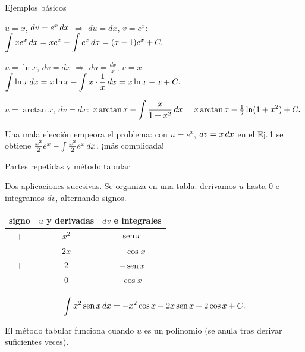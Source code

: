 \documentclass[10pt,aspectratio=169]{beamer}
\begin{document}
\begin{frame}{Ejemplos básicos}
  \begin{ejemplo}[1: $\int x e^x\dx$]
    $u=x$, $dv=e^x\,dx$ $\Rightarrow$ $du=dx$, $v=e^x$:
    \quad $\displaystyle\int xe^x\,dx=xe^x-\int e^x\,dx=(x-1)e^x+C.$
  \end{ejemplo}
  \begin{ejemplo}[2: $\int\ln x\dx$ \ (¡$dv=dx$!)]
    $u=\ln x$, $dv=dx$ $\Rightarrow$ $du=\frac{dx}{x}$, $v=x$:
    \quad $\displaystyle\int\ln x\,dx=x\ln x-\int x\cdot\frac1x\,dx=x\ln x-x+C.$
  \end{ejemplo}
  \begin{ejemplo}
    $u=\arctan x$, $dv=dx$:
    \quad $\displaystyle x\arctan x-\int\frac{x}{1+x^2}\,dx=x\arctan x-\tfrac12\ln(1+x^2)+C.$
  \end{ejemplo}
  \begin{observacion}
    Una mala elección empeora el problema: con $u=e^x$, $dv=x\,dx$ en el Ej.\,1 se obtiene
    $\tfrac{x^2}{2}e^x-\int\tfrac{x^2}{2}e^x\,dx$, ¡más complicada!
  \end{observacion}
\end{frame}

\begin{frame}{Partes repetidas y método tabular}
  \begin{ejemplo}
    Dos aplicaciones sucesivas. Se organiza en una tabla: derivamos $u$ hasta $0$ e integramos $dv$,
    alternando signos.
    \begin{center}
      \renewcommand{\arraystretch}{1.3}
      \begin{tabular}{c|c|c}
        signo & $u$ y derivadas & $dv$ e integrales\\ \hline
        $+$ & $x^2$ & $\operatorname{sen} x$\\
        $-$ & $2x$ & $-\cos x$\\
        $+$ & $2$ & $-\operatorname{sen} x$\\
            & $0$ & $\cos x$
      \end{tabular}
    \end{center}
    \[ \int x^2\operatorname{sen} x\,dx=-x^2\cos x+2x\operatorname{sen} x+2\cos x+C. \]
  \end{ejemplo}
  \begin{observacion}
    El método tabular funciona cuando $u$ es un polinomio (se anula tras derivar suficientes veces).
  \end{observacion}
\end{frame}
\end{document}

